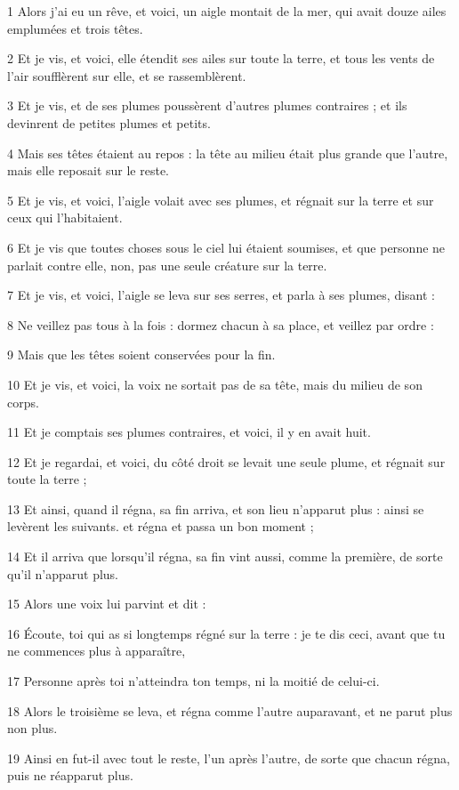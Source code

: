 \par 1 Alors j'ai eu un rêve, et voici, un aigle montait de la mer, qui avait douze ailes emplumées et trois têtes.
\par 2 Et je vis, et voici, elle étendit ses ailes sur toute la terre, et tous les vents de l'air soufflèrent sur elle, et se rassemblèrent.
\par 3 Et je vis, et de ses plumes poussèrent d'autres plumes contraires ; et ils devinrent de petites plumes et petits.
\par 4 Mais ses têtes étaient au repos : la tête au milieu était plus grande que l'autre, mais elle reposait sur le reste.
\par 5 Et je vis, et voici, l'aigle volait avec ses plumes, et régnait sur la terre et sur ceux qui l'habitaient.
\par 6 Et je vis que toutes choses sous le ciel lui étaient soumises, et que personne ne parlait contre elle, non, pas une seule créature sur la terre.
\par 7 Et je vis, et voici, l'aigle se leva sur ses serres, et parla à ses plumes, disant :
\par 8 Ne veillez pas tous à la fois : dormez chacun à sa place, et veillez par ordre :
\par 9 Mais que les têtes soient conservées pour la fin.
\par 10 Et je vis, et voici, la voix ne sortait pas de sa tête, mais du milieu de son corps.
\par 11 Et je comptais ses plumes contraires, et voici, il y en avait huit.
\par 12 Et je regardai, et voici, du côté droit se levait une seule plume, et régnait sur toute la terre ;
\par 13 Et ainsi, quand il régna, sa fin arriva, et son lieu n'apparut plus : ainsi se levèrent les suivants. et régna et passa un bon moment ;
\par 14 Et il arriva que lorsqu'il régna, sa fin vint aussi, comme la première, de sorte qu'il n'apparut plus.
\par 15 Alors une voix lui parvint et dit :
\par 16 Écoute, toi qui as si longtemps régné sur la terre : je te dis ceci, avant que tu ne commences plus à apparaître,
\par 17 Personne après toi n'atteindra ton temps, ni la moitié de celui-ci.
\par 18 Alors le troisième se leva, et régna comme l'autre auparavant, et ne parut plus non plus.
\par 19 Ainsi en fut-il avec tout le reste, l'un après l'autre, de sorte que chacun régna, puis ne réapparut plus.
